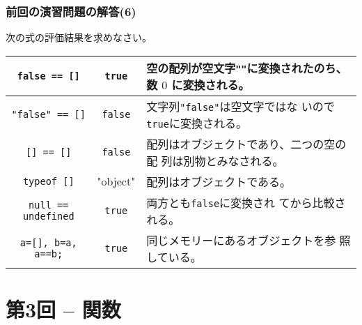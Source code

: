 \begin{frame}[containsverbatim]
\frametitle{前回の演習問題の解答(6)}
次の式の評価結果を求めなさい。
\begin{center}
 \begin{tabular}{|>{\Rule}c|c|m{}|}\hline
  \Verb+false == []+& \Verb+true+& 空の配列が空文字\texttt{""}に変換されたのち、
    数 $0$ に変換される。\\ \hline
  \Verb+"false" == []+& \Verb+false+& 文字列\Verb+"false"+は空文字ではな
    いので\Verb+true+に変換される。\\ \hline
  \Verb+[] == []+& \Verb+false+& 配列はオブジェクトであり、二つの空の配
    列は別物とみなされる。\\ \hline
  \Verb+typeof []+& "object"& 配列はオブジェクトである。\\ \hline
  \Verb+null == undefined+& \Verb+true+ & 両方とも\Verb+false+に変換され
    てから比較される。\\ \hline
  \Verb+a=[], b=a, a==b;+&\Verb+true+&同じメモリーにあるオブジェクトを参
    照している。\\ \hline
 \end{tabular}
\end{center}
\end{frame}
\section{第3回 -- 関数}
\iffalse
\subsection{今回の内容}
\begin{frame}[containsverbatim]
\frametitle{今回の内容}
\begin{itemize}
 \item 関数の定義方法と使用法
 \item 関数への引数の渡し方
 \item 関数の戻り値
 \item JavaScript内での変数のスコープ
 \item 関数も単なるオブジェクト
 \item 無名関数
 \item コールバック関数
 \item 自己実行可能関数
 \item 関数を返す関数
 \item クロージャ
\end{itemize}
\end{frame}
\fi
